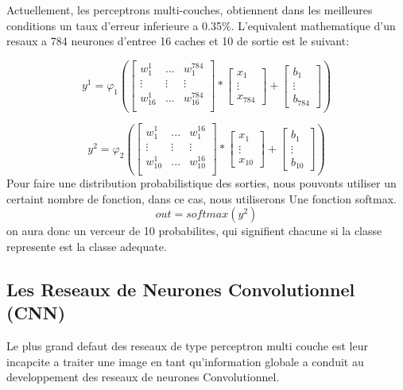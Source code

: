 \documentclass[twoside,twocolumn]{article}
\begin{document}
Actuellement, les perceptrons multi-couches, obtiennent dans les meilleures conditions un taux d'erreur inferieure a 0.35\%.\cite{DeepBig} L'equivalent mathematique d'un resaux a 784 neurones d'entree 16 caches et 10 de sortie est le suivant:

\[
y^1 = \varphi_1(
\left[
  \begin{array}{ccc}
    w_{1}^{1} & ... & w_{1}^{784}\\
    \vdots & \vdots & \vdots\\
    w_{16}^{1} & ... & w_{16}^{784}\\  
  \end{array}
\right]*
\begin{bmatrix}
           x_{1} \\
           \vdots \\
           x_{784}
         \end{bmatrix}
+ \begin{bmatrix}
  b_{1} \\
  \vdots \\
  b_{784}
\end{bmatrix}
)\]

\[
y^2 = \varphi_2(
\left[
  \begin{array}{ccc}
    w_{1}^{1} & ... & w_{1}^{16}\\
    \vdots & \vdots & \vdots\\
    w_{10}^{1} & ... & w_{10}^{16}\\  
  \end{array}
\right]*
\begin{bmatrix}
           x_{1} \\
           \vdots \\
           x_{10}
         \end{bmatrix}
+ \begin{bmatrix}
  b_{1} \\
  \vdots \\
  b_{10}
\end{bmatrix}
)\]
Pour faire une distribution probabilistique des sorties, nous pouvonts utiliser un certaint nombre de fonction, dans ce cas, nous utiliserons 
Une fonction softmax.
\[
out = softmax(y^2)
\]
on aura donc un verceur de 10 probabilites, qui signifient chacune si la classe represente est la classe adequate.


\subsection{Les Reseaux de Neurones Convolutionnel (CNN)}
Le plus grand defaut des reseaux de type perceptron multi couche est leur incapcite a traiter une image en tant qu'information globale a conduit au developpement des
reseaux de neurones Convolutionnel.
\end{document}

